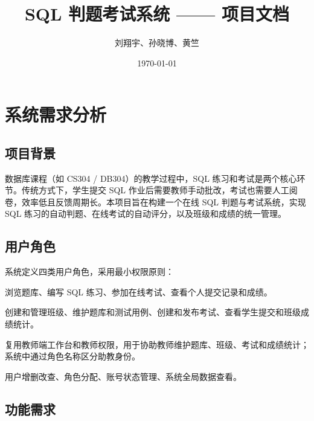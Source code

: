 \documentclass[12pt,a4paper]{ctexart}
\title{\textbf{SQL 判题考试系统 —— 项目文档}}
\author{刘翔宇、孙晓博、黄竺}
\date{\today}
\begin{document}
\maketitle
\tableofcontents
\newpage

\section{系统需求分析}

\subsection{项目背景}

数据库课程（如 CS304 / DB304）的教学过程中，SQL 练习和考试是两个核心环节。传统方式下，学生提交 SQL 作业后需要教师手动批改，考试也需要人工阅卷，效率低且反馈周期长。本项目旨在构建一个在线 SQL 判题与考试系统，实现 SQL 练习的自动判题、在线考试的自动评分，以及班级和成绩的统一管理。

\subsection{用户角色}

系统定义四类用户角色，采用最小权限原则：

\begin{description}[leftmargin=2em]
  \item[学生（STUDENT）] 浏览题库、编写 SQL 练习、参加在线考试、查看个人提交记录和成绩。
  \item[教师（TEACHER）] 创建和管理班级、维护题库和测试用例、创建和发布考试、查看学生提交和班级成绩统计。
  \item[助教（ASSISTANT）] 复用教师端工作台和教师权限，用于协助教师维护题库、班级、考试和成绩统计；系统中通过角色名称区分助教身份。
  \item[管理员（ADMIN）] 用户增删改查、角色分配、账号状态管理、系统全局数据查看。
\end{description}

\subsection{功能需求}
\end{document}
